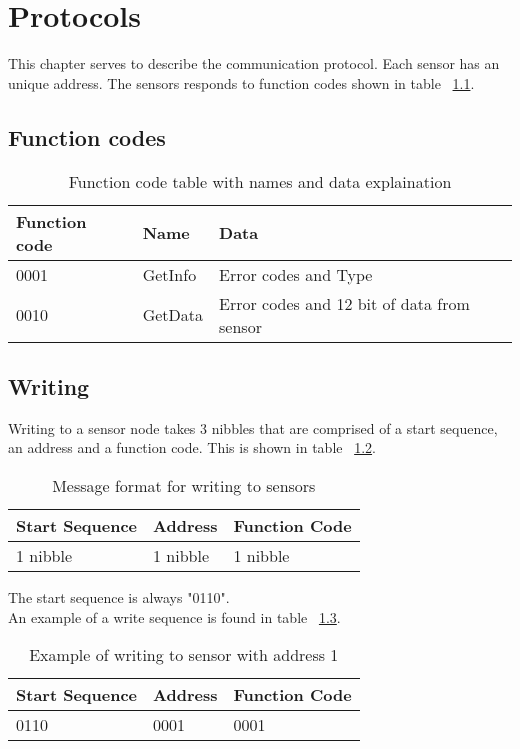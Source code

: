 \chapter{Protocols}
This chapter serves to describe the communication protocol. Each sensor has an unique address. The sensors responds to function codes shown in table ~\ref{table:functioncodes}.

\section{Function codes}
\begin{table}[H]
\centering
\begin{tabular}{|l|l|l|}
	\hline
	Function code & Name & Data \\ 
	\hline
	0001 	& GetInfo & Error codes and Type \\
	\hline
	0010	& GetData & Error codes and 12 bit of data from sensor \\
	\hline
\end{tabular}
\caption{Function code table with names and data explaination}
\label{table:functioncodes}
\end{table}

\section{Writing}
Writing to a sensor node takes 3 nibbles that are comprised of a start sequence, an address and a function code. This is shown in table ~\ref{table:stdmsgtosensor}. 
\begin{table}[H]
\centering
\begin{tabular}{|l|l|l|}
	\hline
	Start Sequence & Address & Function Code \\ \hline
	1 nibble & 1 nibble	& 1 nibble \\
	\hline
\end{tabular}
\caption{Message format for writing to sensors}
\label{table:stdmsgtosensor}
\end{table}
The start sequence is always "0110".\\

An example of a write sequence is found in table ~\ref{table:writingexample}.\\
\begin{table}[H]
\centering
\begin{tabular}{|l|l|l|}
	\hline
	Start Sequence & Address & Function Code \\ \hline
	0110 & 0001	& 0001 \\
	\hline
\end{tabular}
\caption{Example of writing to sensor with address 1}
\label{table:writingexample}
\end{table}

